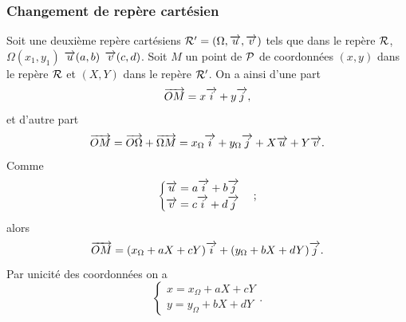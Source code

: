 \subsubsection{Changement de repère cartésien}
\label{subsubsec:changementsdereperecart}
Soit une deuxième repère cartésiens $\Rep'=(\Omega,\vu,\vv)$ tels que dans le repère $\Rep$, $\Omega(x_1,y_1)$ $\vu(a,b)$ $\vv(c,d)$. Soit $M$ un point de $\P$ de coordonnées $(x,y)$ dans le repère $\Rep$ et $(X,Y)$ dans le repère $\Rep'$.
On a ainsi d'une part
\begin{equation}
 \vect{OM}=x \vi+ y \vj, 
\end{equation}
et d'autre part
\begin{equation}
  \vect{OM}=\vect{O\Omega}+\vect{\Omega M}=x_\Omega \vi + y_\Omega \vj + X \vu +Y\vv.
\end{equation}
Comme
\begin{equation}
  \begin{cases}
    \vu=a \vi + b \vj \\
    \vv=c\vi+d\vj
  \end{cases};
\end{equation}
alors
\begin{equation}
 \vect{OM}=(x_\Omega+aX+cY)\vi+(y_\Omega+bX+dY) \vj. 
\end{equation}
Par unicité des coordonnées on a
\begin{equation}
  \begin{cases}
    x=x_\Omega+aX+cY\\
    y=y_\Omega+bX+dY
  \end{cases}.
\end{equation}
%
